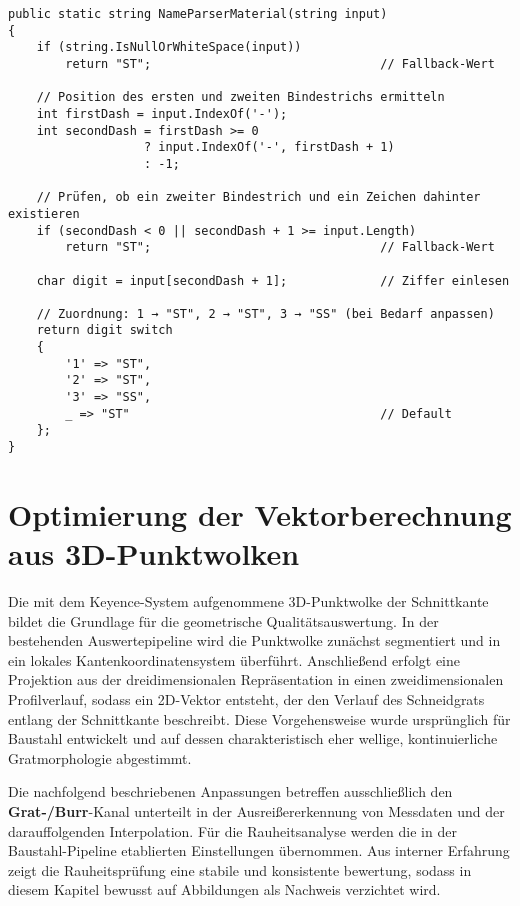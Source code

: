 \begin{lstlisting}[language={[Sharp]C}, caption={Werkstoffabhängiges Routing der Handscanner-Setups}, label={lst:messzellen-routing}]
public static string NameParserMaterial(string input)
{
    if (string.IsNullOrWhiteSpace(input))
        return "ST";                                // Fallback-Wert

    // Position des ersten und zweiten Bindestrichs ermitteln
    int firstDash = input.IndexOf('-');
    int secondDash = firstDash >= 0
                   ? input.IndexOf('-', firstDash + 1)
                   : -1;

    // Prüfen, ob ein zweiter Bindestrich und ein Zeichen dahinter existieren
    if (secondDash < 0 || secondDash + 1 >= input.Length)
        return "ST";                                // Fallback-Wert

    char digit = input[secondDash + 1];             // Ziffer einlesen

    // Zuordnung: 1 → "ST", 2 → "ST", 3 → "SS" (bei Bedarf anpassen)
    return digit switch
    {
        '1' => "ST",
        '2' => "ST",
        '3' => "SS",
        _ => "ST"                                   // Default
    };
}
\end{lstlisting}

\section{Optimierung der Vektorberechnung aus 3D-Punktwolken}

Die mit dem Keyence-System aufgenommene 3D-Punktwolke der Schnittkante bildet die Grundlage für die geometrische Qualitätsauswertung. In der bestehenden Auswertepipeline wird die Punktwolke zunächst segmentiert und in ein lokales Kantenkoordinatensystem überführt. Anschließend erfolgt eine Projektion aus der dreidimensionalen Repräsentation in einen zweidimensionalen Profilverlauf, sodass ein 2D-Vektor entsteht, der den Verlauf des Schneidgrats entlang der Schnittkante beschreibt. Diese Vorgehensweise wurde ursprünglich für Baustahl entwickelt und auf dessen charakteristisch eher wellige, kontinuierliche Gratmorphologie abgestimmt.

Die nachfolgend beschriebenen Anpassungen betreffen ausschließlich den \textbf{Grat-/Burr}-Kanal unterteilt in der Ausreißererkennung von Messdaten und der darauffolgenden Interpolation. Für die Rauheitsanalyse werden die in der Baustahl-Pipeline etablierten Einstellungen übernommen. Aus interner Erfahrung zeigt die Rauheitsprüfung eine stabile und konsistente bewertung, sodass in diesem Kapitel bewusst auf Abbildungen als Nachweis verzichtet wird.

